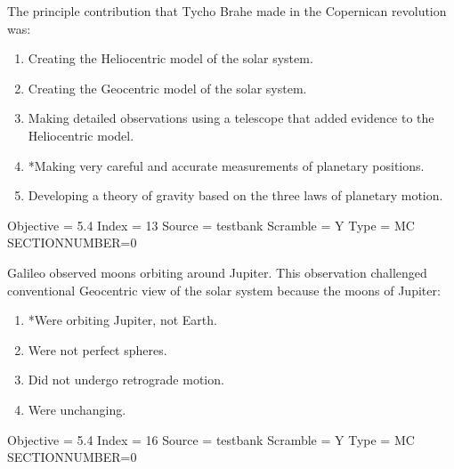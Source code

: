 \documentclass[11pt]{article}
\begin{document}
\begin{enumerate}
\begin{minipage}{\textwidth}
\begin{minipage}{\textwidth}
\item The principle contribution that Tycho Brahe made in the Copernican revolution was:
\begin{enumerate} 
\setlength{\itemsep}{1pt} 
\setlength{\parskip}{0pt} 
\setlength{\parsep}{0pt}
\setlength{\multicolsep}{1pt} 
\item Creating the Heliocentric model of the solar system.
\item Creating the Geocentric model of the solar system.
\item Making detailed observations using a telescope that added evidence to the Heliocentric model.
\item *Making very careful and accurate measurements of planetary positions.
\item Developing a theory of gravity based on the three laws of planetary motion.
\end{enumerate} 
Objective = 5.4
Index = 13
Source = testbank
Scramble = Y
Type = MC
SECTIONNUMBER=0
\end{minipage}
\end{minipage}
\vskip 0.20in

\begin{minipage}{\textwidth}
\begin{minipage}{\textwidth}
\item Galileo observed moons orbiting around Jupiter.    This observation challenged conventional Geocentric view of the solar system because the moons of Jupiter:
\begin{multicols}{2}
\begin{enumerate} 
\setlength{\itemsep}{1pt} 
\setlength{\parskip}{0pt} 
\setlength{\parsep}{0pt}
\setlength{\multicolsep}{1pt} 
\item *Were orbiting Jupiter, not Earth.
\item Were not perfect spheres.
\item Did not undergo retrograde motion.
\item Were unchanging.
\end{enumerate} 
\vfill 
\end{multicols}

Objective = 5.4
Index = 16
Source = testbank
Scramble = Y
Type = MC
SECTIONNUMBER=0
\end{minipage}
\end{minipage}
\vskip 0.20in


\end{enumerate}
\end{document}
